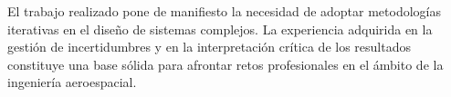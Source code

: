 El trabajo realizado pone de manifiesto la necesidad de adoptar metodologías iterativas en el diseño de sistemas complejos. La experiencia adquirida en la gestión de incertidumbres y en la interpretación crítica de los resultados constituye una base sólida para afrontar retos profesionales en el ámbito de la ingeniería aeroespacial.

